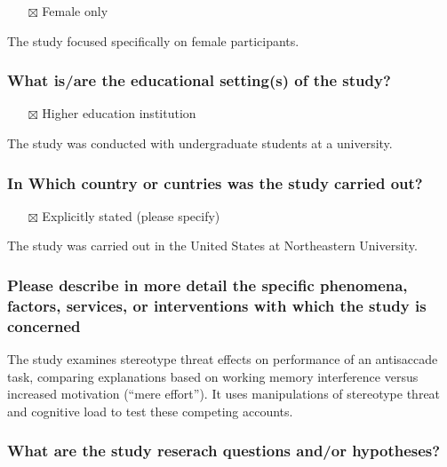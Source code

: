 \documentclass[
  doc, a4paper]{apa7}
\providecommand{\tightlist}{%
  \setlength{\itemsep}{0pt}\setlength{\parskip}{0pt}}
\begin{document}
\begin{itemize}
\tightlist
\item[$\boxtimes$]
  Female only
\end{itemize}

The study focused specifically on female participants.

\subsubsection{What is/are the educational setting(s) of the study?}\label{what-isare-the-educational-settings-of-the-study}

\begin{itemize}
\tightlist
\item[$\boxtimes$]
  Higher education institution
\end{itemize}

The study was conducted with undergraduate students at a university.

\subsubsection{In Which country or cuntries was the study carried out?}\label{in-which-country-or-cuntries-was-the-study-carried-out}

\begin{itemize}
\tightlist
\item[$\boxtimes$]
  Explicitly stated (please specify)
\end{itemize}

The study was carried out in the United States at Northeastern University.

\subsubsection{Please describe in more detail the specific phenomena, factors, services, or interventions with which the study is concerned}\label{please-describe-in-more-detail-the-specific-phenomena-factors-services-or-interventions-with-which-the-study-is-concerned}

The study examines stereotype threat effects on performance of an antisaccade task, comparing explanations based on working memory interference versus increased motivation (``mere effort''). It uses manipulations of stereotype threat and cognitive load to test these competing accounts.

\subsubsection{What are the study reserach questions and/or hypotheses?}\label{what-are-the-study-reserach-questions-andor-hypotheses}
\end{document}
